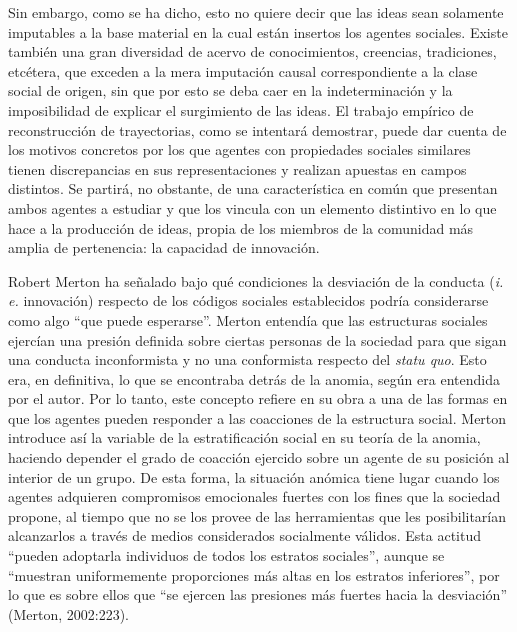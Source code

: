 Sin embargo, como se ha dicho, esto no quiere decir que las ideas sean solamente imputables a la base material en la cual están insertos los agentes sociales. Existe también una gran diversidad de acervo de conocimientos, creencias, tradiciones, etcétera, que exceden a la mera imputación causal correspondiente a la clase social de origen, sin que por esto se deba caer en la indeterminación y la imposibilidad de explicar el surgimiento de las ideas. El trabajo empírico de reconstrucción de trayectorias, como se intentará demostrar, puede dar cuenta de los motivos concretos por los que agentes con propiedades sociales similares tienen discrepancias en sus representaciones y realizan apuestas en campos distintos. Se partirá, no obstante, de una característica en común que presentan ambos agentes a estudiar y que los vincula con un elemento distintivo en lo que hace a la producción de ideas, propia de los miembros de la comunidad más amplia de pertenencia: la capacidad de innovación.

Robert Merton ha señalado bajo qué condiciones la desviación de la conducta (\emph{i. e.} innovación) respecto de los códigos sociales establecidos podría considerarse como algo ``que puede esperarse''. Merton entendía que las estructuras sociales ejercían una presión definida sobre ciertas personas de la sociedad para que sigan una conducta inconformista y no una conformista respecto del \emph{statu quo}. Esto era, en definitiva, lo que se encontraba detrás de la anomia, según era entendida por el autor. Por lo tanto, este concepto refiere en su obra a una de las formas en que los agentes pueden responder a las coacciones de la estructura social. Merton introduce así la variable de la estratificación social en su teoría de la anomia, haciendo depender el grado de coacción ejercido sobre un agente de su posición al interior de un grupo. De esta forma, la situación anómica tiene lugar cuando los agentes adquieren compromisos emocionales fuertes con los fines que la sociedad propone, al tiempo que no se los provee de las herramientas que les posibilitarían alcanzarlos a través de medios considerados socialmente válidos. Esta actitud ``pueden adoptarla individuos de todos los estratos sociales'', aunque se ``muestran uniformemente proporciones más altas en los estratos inferiores'', por lo que es sobre ellos que ``se ejercen las presiones más fuertes hacia la desviación'' (Merton, 2002:223).

